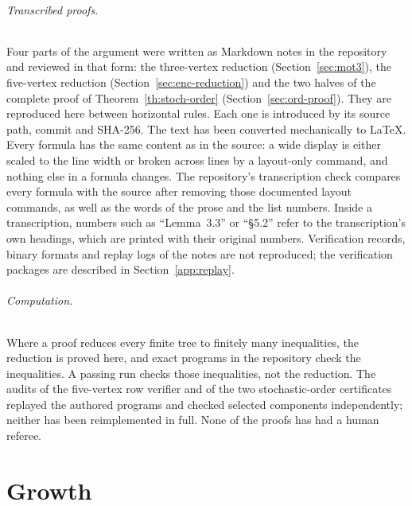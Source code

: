 \documentclass[11pt]{article}
\newcommand{\sectag}[1]{\renewcommand{\thesection}{#1}\renewcommand{\theHsection}{#1}}
\theoremstyle{remark}
\numberwithin{equation}{section}
\begin{document}
\paragraph{Transcribed proofs.} Four parts of the argument were written as Markdown notes in the repository and reviewed in that form: the three-vertex reduction (Section~\ref{sec:mot3}), the five-vertex reduction (Section~\ref{sec:enc-reduction}) and the two halves of the complete proof of Theorem~\ref{th:stoch-order} (Section~\ref{sec:ord-proof}). They are reproduced here between horizontal rules. Each one is introduced by its source path, commit and SHA-256. The text has been converted mechanically to \LaTeX{}. Every formula has the same content as in the source: a wide display is either scaled to the line width or broken across lines by a layout-only command, and nothing else in a formula changes. The repository's transcription check compares every formula with the source after removing those documented layout commands, as well as the words of the prose and the list numbers. Inside a transcription, numbers such as ``Lemma~3.3'' or ``\S5.2'' refer to the transcription's own headings, which are printed with their original numbers. Verification records, binary formats and replay logs of the notes are not reproduced; the verification packages are described in Section~\ref{app:replay}.

\paragraph{Computation.} Where a proof reduces every finite tree to finitely many inequalities, the reduction is proved here, and exact programs in the repository check the inequalities. A passing run checks those inequalities, not the reduction. The audits of the five-vertex row verifier and of the two stochastic-order certificates replayed the authored programs and checked selected components independently; neither has been reimplemented in full. None of the proofs has had a human referee.

\tableofcontents

\part{Growth}

\sectag{EXP}
\end{document}
